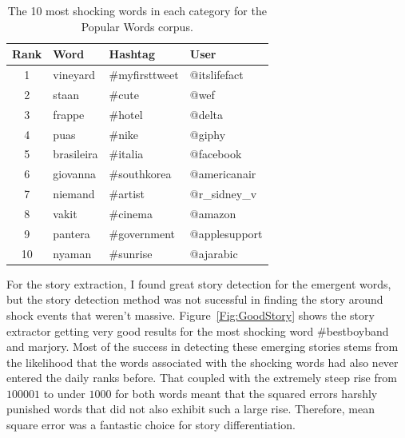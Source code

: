 \documentclass{article}
\begin{document}
\begin{table}
    \centering
    \caption{\label{Tab:Popular} The 10 most shocking words in each category for 
the Popular Words corpus.}
    \begin{tabular}{clll}
        \toprule
        Rank & Word & Hashtag & User \\
        \midrule
        1 & vineyard & \#myfirsttweet & @itslifefact \\
        2 & staan & \#cute & @wef \\
        3 & frappe & \#hotel & @delta \\
        4 & puas & \#nike & @giphy \\
        5 & brasileira & \#italia & @facebook \\
        6 & giovanna & \#southkorea & @americanair \\
        7 & niemand & \#artist & @r\_sidney\_v \\
        8 & vakit & \#cinema & @amazon \\
        9 & pantera & \#government & @applesupport \\
        10 & nyaman & \#sunrise & @ajarabic\\
        \bottomrule
    \end{tabular}
\end{table}

For the story extraction,
I found great story detection for the emergent words,
but the story detection method was not sucessful in finding the story
around shock events that weren't massive.
Figure~\ref{Fig:GoodStory} shows the story extractor getting very good results
for the most shocking word \#bestboyband and marjory.
Most of the success in detecting these emerging stories stems from the
likelihood that the words associated with the shocking words had also
never entered the daily ranks before.
That coupled with the extremely steep rise from $100001$ to under $1000$ for
both words meant that the squared errors harshly punished words that did not
also exhibit such a large rise.
Therefore,
mean square error was a fantastic choice for story differentiation.
\end{document}

